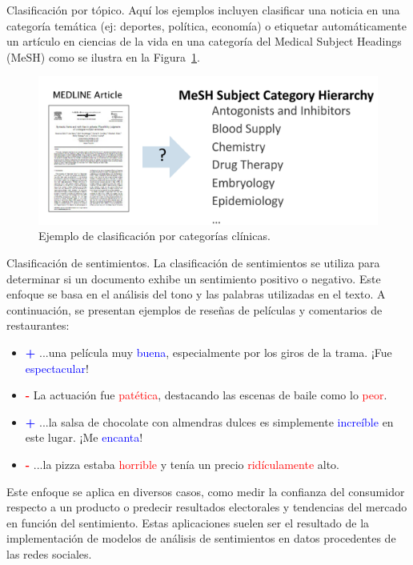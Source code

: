 \documentclass[11pt,fleqn]{book} %
\begin{document}
\begin{example}
Clasificación por tópico. Aquí los ejemplos incluyen clasificar una noticia en una categoría temática (ej: deportes, política, economía) o etiquetar automáticamente un artículo en ciencias de la vida en una categoría del Medical Subject Headings (MeSH) como se ilustra en la Figura~\ref{fig:medarticle}.

\begin{figure}[h]
    \centering
    \includegraphics[scale = 0.2]{pics/medarticle.png}
    \caption{Ejemplo de clasificación por categorías clínicas.}
    \label{fig:medarticle}
\end{figure}
 

 
\end{example}



\begin{example}
Clasificación de sentimientos. La clasificación de sentimientos se utiliza para determinar si un documento exhibe un sentimiento positivo o negativo. Este enfoque se basa en el análisis del tono y las palabras utilizadas en el texto. A continuación, se presentan ejemplos de reseñas de películas y comentarios de restaurantes:

\begin{itemize}
    \item \textcolor{blue}{\textbf{+}} ...una película muy \textcolor{blue}{buena}, especialmente por los giros de la trama. ¡Fue \textcolor{blue}{espectacular}!
    \item \textcolor{red}{\textbf{-}} La actuación fue \textcolor{red}{patética}, destacando las escenas de baile como lo \textcolor{red}{peor}.
    \item \textcolor{blue}{\textbf{+}} ...la salsa de chocolate con almendras dulces es simplemente \textcolor{blue}{increíble} en este lugar. ¡Me \textcolor{blue}{encanta}!
    \item \textcolor{red}{\textbf{-}} ...la pizza estaba \textcolor{red}{horrible} y tenía un precio \textcolor{red}{ridículamente} alto.
\end{itemize}

Este enfoque se aplica en diversos casos, como medir la confianza del consumidor respecto a un producto o predecir resultados electorales y tendencias del mercado en función del sentimiento. Estas aplicaciones suelen ser el resultado de la implementación de modelos de análisis de sentimientos en datos procedentes de las redes sociales.
\end{example}
\end{document}
